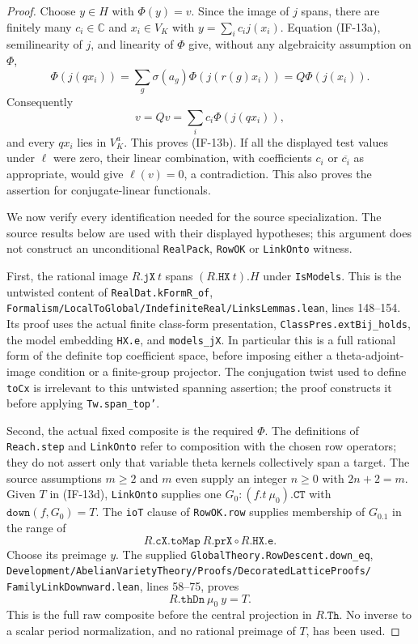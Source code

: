 \begin{proof}
Choose $y\in H$ with $\Phi(y)=v$. Since the image of $j$ spans,
there are finitely many $c_i\in\mathbb C$ and $x_i\in V_K$ with
$y=\sum_i c_i j(x_i)$. Equation (IF-13a), semilinearity of $j$,
and linearity of $\Phi$ give, without any algebraicity assumption
on $\Phi$,
\[
 \Phi(j(qx_i))
  =\sum_g\sigma(a_g)\Phi(j(r(g)x_i))
  =Q\Phi(j(x_i)).                                        \tag{IF-13f}
\]
Consequently
\[
 v=Qv=\sum_i c_i\Phi(j(qx_i)),
\]
and every $qx_i$ lies in $V_K^a$. This proves (IF-13b). If all
the displayed test values under $\ell$ were zero, their linear
combination, with coefficients $c_i$ or $\overline{c_i}$ as
appropriate, would give $\ell(v)=0$, a contradiction. This also
proves the assertion for conjugate-linear functionals.

We now verify every identification needed for the source
specialization. The source results below are used with their
displayed hypotheses; this argument does not construct an
unconditional \texttt{RealPack}, \texttt{RowOK} or
\texttt{LinkOnto} witness.

First, the rational image $R.\texttt{jX}\ t$ spans
$(R.\texttt{HX}\ t).H$ under \texttt{IsModels}. This is the
untwisted content of \texttt{RealDat.kFormR\_of},
\texttt{Formalism/LocalToGlobal/IndefiniteReal/LinksLemmas.lean},
lines 148--154. Its proof uses the actual finite class-form
presentation, \texttt{ClassPres.extBij\_holds}, the model
embedding \texttt{HX.e}, and \texttt{models\_jX}. In particular
this is a full rational form of the definite top coefficient
space, before imposing either a theta-adjoint-image condition or a
finite-group projector. The conjugation twist used to define
\texttt{toCx} is irrelevant to this untwisted spanning assertion;
the proof constructs it before applying \texttt{Tw.span\_top'}.

Second, the actual fixed composite is the required $\Phi$.
The definitions of \texttt{Reach.step} and \texttt{LinkOnto}
refer to composition with the chosen row operators; they do not
assert only that variable theta kernels collectively span a target.
The source assumptions $m\ge2$ and $m$ even supply an integer
$n\ge0$ with $2n+2=m$. Given $T$ in (IF-13d),
\texttt{LinkOnto} supplies one
$G_0:(f.t\ \mu_0).\texttt{CT}$ with
$\texttt{down}(f,G_0)=T$. The \texttt{ioT} clause of
\texttt{RowOK.row} supplies membership of $G_0.1$ in the range of
\[
 R.\texttt{cX.toMap}\ R.\texttt{prX}\circ R.\texttt{HX.e}.
\]
Choose its preimage $y$. The supplied
\texttt{GlobalTheory.RowDescent.down\_eq},
\texttt{Development/AbelianVarietyTheory/Proofs/DecoratedLatticeProofs/}
\texttt{FamilyLinkDownward.lean}, lines 58--75, proves
\[
              R.\texttt{thDn}\ \mu_0\ y=T.                \tag{IF-13g}
\]
This is the full raw composite before the central projection in
$R.\texttt{Th}$. No inverse to a scalar period normalization, and
no rational preimage of $T$, has been used.


\end{proof}
